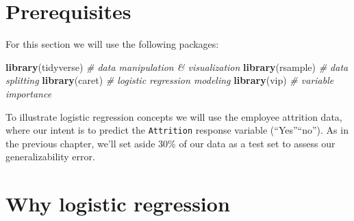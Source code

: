 \documentclass[]{book}
\newenvironment{Shaded}{\begin{snugshade}}{\end{snugshade}}
\newcommand{\CommentTok}[1]{\textcolor[rgb]{0.56,0.35,0.01}{\textit{#1}}}
\newcommand{\DataTypeTok}[1]{\textcolor[rgb]{0.13,0.29,0.53}{#1}}
\newcommand{\DecValTok}[1]{\textcolor[rgb]{0.00,0.00,0.81}{#1}}
\newcommand{\FloatTok}[1]{\textcolor[rgb]{0.00,0.00,0.81}{#1}}
\newcommand{\KeywordTok}[1]{\textcolor[rgb]{0.13,0.29,0.53}{\textbf{#1}}}
\newcommand{\NormalTok}[1]{#1}
\newcommand{\OperatorTok}[1]{\textcolor[rgb]{0.81,0.36,0.00}{\textbf{#1}}}
\newcommand{\OtherTok}[1]{\textcolor[rgb]{0.56,0.35,0.01}{#1}}
\newcommand{\StringTok}[1]{\textcolor[rgb]{0.31,0.60,0.02}{#1}}
\theoremstyle{definition}
\theoremstyle{definition}
\theoremstyle{definition}
\theoremstyle{remark}
\begin{document}
\hypertarget{prerequisites-4}{%
\section{Prerequisites}\label{prerequisites-4}}

For this section we will use the following packages:

\begin{Shaded}
\begin{Highlighting}[]
\KeywordTok{library}\NormalTok{(tidyverse)  }\CommentTok{# data manipulation & visualization}
\KeywordTok{library}\NormalTok{(rsample)    }\CommentTok{# data splitting}
\KeywordTok{library}\NormalTok{(caret)      }\CommentTok{# logistic regression modeling}
\KeywordTok{library}\NormalTok{(vip)        }\CommentTok{# variable importance}
\end{Highlighting}
\end{Shaded}

To illustrate logistic regression concepts we will use the employee
attrition data, where our intent is to predict the \texttt{Attrition}
response variable (``Yes''\textbar{}``no''). As in the previous chapter,
we'll set aside 30\% of our data as a test set to assess our
generalizability error.

\begin{Shaded}
\end{Shaded}

\hypertarget{why-logistic-regression}{%
\section{Why logistic regression}\label{why-logistic-regression}}
\end{document}
